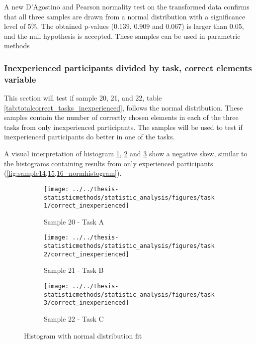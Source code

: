 A new D'Agostino and Pearson normality test on the transformed data confirms that all three samples are drawn from a normal distribution with a significance level of 5\%. The obtained p-values ($0.139$, $0.909$ and $0.067$) is larger than 0.05, and the null hypothesis is accepted. These samples can be used in parametric methods \\[0.2cm]

\subsubsection[Sample 20, 21 and 22]{Inexperienced participants  divided by task, correct elements variable}\label{sec:sample_20,21,22_normalitytest}
This section will test if sample 20, 21, and 22, table \ref{tab:totalcorrect_tasks_inexperienced}, follows the normal distribution. These samples contain the number of correctly chosen elements in each of the three tasks from only inexperienced participants. The samples will be used to test if inexperienced participants do better in one of the tasks. 

A visual interpretation of histogram \ref{fig:correctinexperienced_task1}, \ref{fig:correctinexperienced_task2} and \ref{fig:correctinexperienced_task3} show a negative skew, similar to the histograms containing results from only experienced participants (\ref{fig:sample14,15,16_normhistogram}).

\begin{figure}[H]
	\centering
	\begin{subfigure}[b]{0.32\textwidth}
		\centering
		\texttt{[image: ../../thesis-statisticmethods/statistic\_analysis/figures/task1/correct\_inexperienced]}
		\caption{Sample 20 - Task A}
		\label{fig:correctinexperienced_task1}
	\end{subfigure}
	\begin{subfigure}[b]{0.32\textwidth}
		\centering
		\texttt{[image: ../../thesis-statisticmethods/statistic\_analysis/figures/task2/correct\_inexperienced]}
		\caption{Sample 21 - Task B}
		\label{fig:correctinexperienced_task2}
	\end{subfigure}
	\begin{subfigure}[b]{0.32\textwidth}
		\centering
		\texttt{[image: ../../thesis-statisticmethods/statistic\_analysis/figures/task3/correct\_inexperienced]}
		\caption{Sample 22 - Task C}
		\label{fig:correctinexperienced_task3}
	\end{subfigure}
	\caption{Histogram with normal distribution fit}
	\label{fig:sample20,21,22_normtest_original}
\end{figure}

